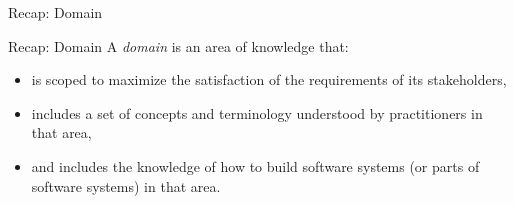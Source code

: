 
\begin{frame}{Recap: Domain}
	\begin{mycolumns}[animation=none]
		\begin{definition}{Recap: Domain  \hfill\tiny\lectureintroduction}
			\mycitebegin A \emph{domain} is an area of knowledge that:
			\begin{itemize}
				\item is scoped to maximize the satisfaction of the requirements of its stakeholders,
				\item includes a set of concepts and terminology understood by practitioners in that area,
				\item and includes the knowledge of how to build software systems (or parts of
				software systems) in that area.\myciteend
			\end{itemize}
		\end{definition}
	\mynextcolumn
	\end{mycolumns}
\end{frame}


